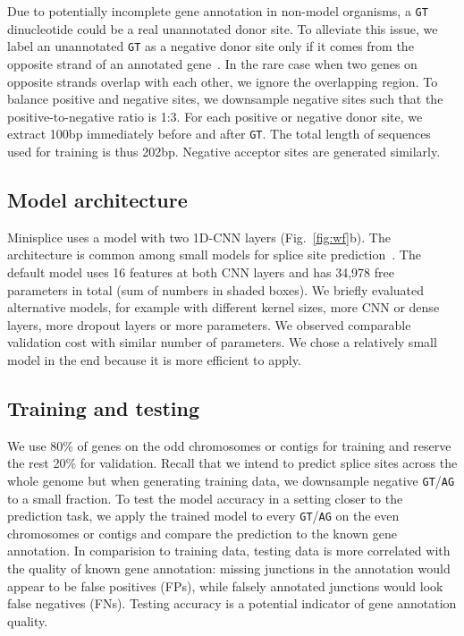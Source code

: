 \documentclass[webpdf,contemporary,large,namedate]{oup-authoring-template}%
\begin{document}
Due to potentially incomplete gene annotation in non-model organisms,
a {\tt GT} dinucleotide could be a real unannotated donor site.
To alleviate this issue, we label an unannotated {\tt GT} as a negative donor site
only if it comes from the opposite strand of an annotated gene~\citep{Chao:2024aa}.
In the rare case when two genes on opposite strands overlap with each other,
we ignore the overlapping region.
To balance positive and negative sites,
we downsample negative sites such that the positive-to-negative ratio is 1:3.
For each positive or negative donor site,
we extract 100bp immediately before and after {\tt GT}.
The total length of sequences used for training is thus 202bp.
Negative acceptor sites are generated similarly.

\subsection{Model architecture}

Minisplice uses a model with two 1D-CNN layers (Fig.~\ref{fig:wf}b).
The architecture is common among small models for splice site prediction~\citep{Zabardast:2023aa}.
The default model uses 16 features at both CNN layers and has 34,978 free parameters in total (sum of numbers in shaded boxes).
We briefly evaluated alternative models, for example with different kernel sizes, more CNN or dense layers, more dropout layers or more parameters.
We observed comparable validation cost with similar number of parameters.
We chose a relatively small model in the end because it is more efficient to apply.

\subsection{Training and testing}

We use 80\% of genes on the odd chromosomes or contigs for training and reserve the rest 20\% for validation.
Recall that we intend to predict splice sites across the whole genome
but when generating training data, we downsample negative {\tt GT}/{\tt AG} to a small fraction.
To test the model accuracy in a setting closer to the prediction task,
we apply the trained model to every {\tt GT}/{\tt AG} on the even chromosomes or contigs
and compare the prediction to the known gene annotation.
In comparision to training data, testing data is more correlated with the quality of known gene annotation:
missing junctions in the annotation would appear to be false positives (FPs),
while falsely annotated junctions would look false negatives (FNs).
Testing accuracy is a potential indicator of gene annotation quality.
\end{document}
